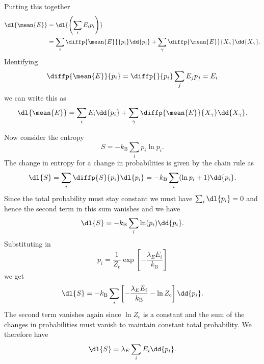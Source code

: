 \documentclass[fleqn]{NotesClass}
\newcommand*{\boltzmann}{k_{\mathrm{B}}}
\newcommand*{\cpartition}{Z_{\mathrm{c}}}
\begin{document}
    Putting this together
    \begin{align}
        \dl{\mean{E}} &= \dl{\left( \sum_i E_i p_i \right)}\\
        &= \sum_i \diffp{\mean{E}}{p_i} \dd{p_i} + \sum_\gamma \diffp{\mean{E}}{X_\gamma} \dd{X_\gamma}.
    \end{align}
    Identifying
    \begin{equation}
        \diffp{\mean{E}}{p_i} = \diffp{}{p_i} \sum_j E_jp_j = E_i
    \end{equation}
    we can write this as
    \begin{equation}\label{eqn:canonical lagrange multiplier derivation}
        \dl{\mean{E}} = \sum_i E_i \dd{p_i} + \sum_\gamma \diffp{\mean{E}}{X_\gamma} \dd{X_\gamma}.
    \end{equation}
    
    Now consider the entropy
    \begin{equation}
        S = -\boltzmann\sum_i p_i \ln p_i.
    \end{equation}
    The change in entropy for a change in probabilities is given by the chain rule as
    \begin{equation}
        \dl{S} = \sum_i \diffp{S}{p_i} \dl{p_i} = -\boltzmann \sum_i (\ln p_i + 1) \dd{p_i}.
    \end{equation}
    Since the total probability must stay constant we must have \(\sum_i \dl{p_i} = 0\) and hence the second term in this sum vanishes and we have
    \begin{equation}
        \dl{S} = -\boltzmann \sum_i \ln(p_i)\dd{p_i}.
    \end{equation}
    Substituting in 
    \begin{equation}
        p_i = \frac{1}{\cpartition} \exp\left[ -\frac{\lambda_E E_i}{\boltzmann} \right]
    \end{equation}
    we get
    \begin{equation}
        \dl{S} = -\boltzmann \sum_i \left[ -\frac{\lambda_E E_i}{\boltzmann} - \ln \cpartition \right] \dd{p_i}.
    \end{equation}
    The second term vanishes again since \(\ln\cpartition\) is a constant and the sum of the changes in probabilities must vanish to maintain constant total probability.
    We therefore have
    \begin{equation}
        \dl{S} = \lambda_E \sum_i E_i \dd{p_i}.
    \end{equation}
\end{document}
